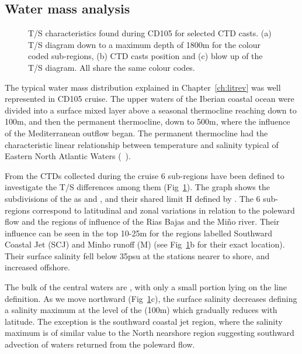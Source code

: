 \subsection{Water mass analysis}
\begin{figure}[t]
\centering \begin{minipage}{7cm} %
\end{minipage}
\begin{minipage}{4cm}
 
\end{minipage}\caption{T/S characteristics found during CD105 for
selected CTD casts. (a) T/S diagram down to a maximum depth of
1800m for the colour coded sub-regions, (b) CTD casts position and
(c) blow up of the T/S diagram. All share the same colour codes. }
\label{fig:cd105ts}\end{figure}

The typical water mass distribution explained in
Chapter~\ref{ch:litrev} was well represented in CD105 cruise. The
upper waters of the Iberian coastal ocean were divided into a
surface mixed layer above a seasonal thermocline reaching down to
100m, and then the permanent thermocline, down to 500m, where the
influence of the Mediterranean outflow began. The permanent
thermocline had the characteristic linear relationship between
temperature and salinity typical of Eastern North Atlantic Waters
(\enaw~).

From the CTDs collected during the cruise 6 sub-regions have been
defined to investigate the T/S differences among them
(Fig~\ref{fig:cd105ts}). The graph shows the subdivisions of the
\enaw as \enawt and \enawp, and their shared limit H defined by
\citet{Rios92}. The 6 sub-regions correspond to latitudinal and
zonal variations in relation to the poleward flow and the regions
of influence of the Rias Bajas and the Mi\~no river. Their
influence can be seen in the top 10-25m for the regions labelled
Southward Coastal Jet (SCJ) and Minho runoff (M) (see
Fig~\ref{fig:cd105ts}b for their exact location). Their surface
salinity fell below 35psu at the stations nearer to shore, and
increased offshore.

The bulk of the central waters are \enawt, with only a small
portion lying on the \enawp line definition. As we move northward
(Fig~\ref{fig:cd105ts}c), the surface salinity decreases defining
a salinity maximum at the level of the \enawt (100m) which
gradually reduces with latitude. The exception is the southward
coastal jet region, where the salinity maximum is of similar value
to the North nearshore region suggesting southward advection of
waters returned from the poleward flow.

